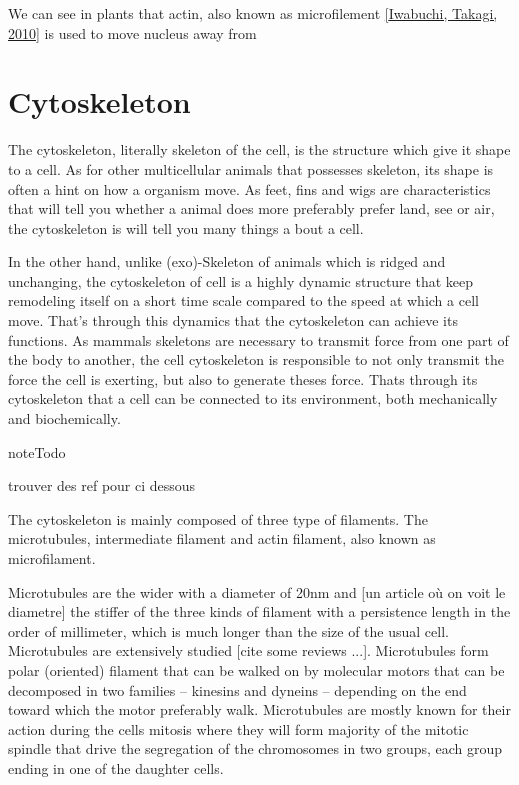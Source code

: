 \documentclass[A4paperpaper,11pt,english]{sphinxmanual}
\begin{document}
We can see in plants that actin, also known as microfilement {\hyperref[bibitem:iwabuchi2010]{{[}Iwabuchi, Takagi,  2010{]}}} is used to move nucleus away from


\section{Cytoskeleton}
\label{parts/part1:cytoskeleton}
The cytoskeleton, literally skeleton of the cell, is the structure which give
it shape to a cell.  As for other multicellular animals that possesses
skeleton, its shape is often a hint on how a organism move. As feet, fins and
wigs are characteristics that will tell you whether a animal does more
preferably prefer land, see or air, the cytoskeleton is will tell you many
things a bout a cell.

In the other hand, unlike (exo)-Skeleton of animals which is ridged and
unchanging, the cytoskeleton of cell is a  highly dynamic structure that keep
remodeling itself on a short time scale compared to the speed at which a cell
move. That's through this dynamics that the cytoskeleton can achieve its
functions.  As mammals skeletons are necessary to transmit force from one part
of the body to another, the cell cytoskeleton is responsible to not only
transmit the force the cell is exerting, but also to generate theses force.
Thats through its cytoskeleton that a cell can be connected to its environment,
both mechanically and biochemically.

\begin{notice}{note}{Todo}

trouver des ref pour ci dessous
\end{notice}

The cytoskeleton is mainly composed of three type of filaments.  The
microtubules, intermediate filament and actin filament, also known as
microfilament.

Microtubules are the wider with a diameter of 20nm and {[}un article où on voit le diametre{]} the stiffer of the three kinds of filament with a persistence
length in the order of millimeter, which is much longer than the size of the
usual cell. Microtubules are extensively studied {[}cite some reviews ...{]}.
Microtubules form polar (oriented) filament that can be walked on by molecular
motors that can be decomposed in two families – kinesins  and dyneins –
depending on the end toward which the motor preferably walk. Microtubules are
mostly known for their action during the cells mitosis where they will form
majority of the mitotic spindle that drive the segregation of the chromosomes
in two groups, each group ending in one of the daughter cells.
\end{document}
